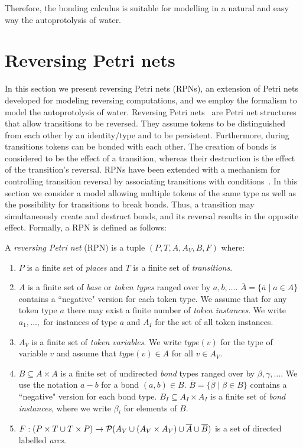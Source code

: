 \documentclass[runningheads]{llncs}
\newcommand{\PN}{reversing Petri net }
\newcommand{\bond}{\!-\!}
\newcommand{\type}{\mathit{type}}
\begin{document}
Therefore, the bonding calculus is suitable for modelling in a 
natural and easy way the autoprotolysis of water.


\section{Reversing Petri nets}
In this section we present reversing Petri nets (RPNs), an extension of Petri nets
developed for modeling reversing computations, and we employ the formalism
to model the autoprotolysis of water. Reversing Petri nets~\cite{RPNs} are 
Petri net structures that allow transitions to be reversed. They assume 
tokens to be distinguished from each other by an identity/type and to be persistent. Furthermore,
during transitions tokens can be bonded with each other. The creation of bonds
is considered to be the effect of a transition, whereas their destruction is the effect of
the transition's reversal. RPNs
have been extended with a mechanism for controlling transition
reversal by associating transitions with conditions~\cite{CRPNs}. In this section we consider
a model allowing multiple tokens of the same type as well as the possibility for 
transitions to break bonds. Thus, a transition may simultaneously create
and destruct bonds, and its reversal results in the opposite effect. Formally, a RPN
is defined as follows:
\begin{definition}{\rm
		A \emph{\PN}(RPN) is a tuple $(P,T,  A, A_V, B, F)$ where:
		\begin{enumerate}
			\item $P$ is a finite set of \emph{places} and
			$T$ is a finite set of \emph{transitions}.
			\item $A$ is a finite set of \emph{base} or \emph{token types} ranged over by $a, b,\ldots$.
			$\overline{A} = 
			\{\overline{a}\mid a\in A\}$ contains a ``negative"  version for each token type. We assume that
			for any token type $a$ there may exist a finite number of \emph{token instances}. 
			We write $a_1,\ldots,$ for
			instances of type $a$ and $A_I$ for the set of all token instances. 
			\item $A_V$ is a finite set of \emph{token variables}. We write $\type(v)$ for the type
			of variable $v$ and assume that $\type(v) \in A$ for all $v\in A_V$.
			\item $B\subseteq A\times A$ is a finite set of undirected \emph{bond} types ranged over
			by $\beta,\gamma,\ldots$. We use the notation $a \bond b$ for a bond $(a,b)\in B$.  
			$\overline{B} = \{\overline{\beta}\mid \beta\in B\}$ contains a ``negative" version for 
			each bond type. $B_I\subseteq A_I\times A_I$ is a finite set of \emph{bond instances},
			where we write $\beta_i$ 
			for elements of $B$.
			\item $F : (P\times T  \cup T \times P)\rightarrow {\cal P}( A_V \cup (A_V \times A_V) \cup \overline{A}
			\cup \overline{B}) $ 
			is a set of directed labelled \emph{arcs}.
		\end{enumerate}
}\end{definition}
\end{document}
